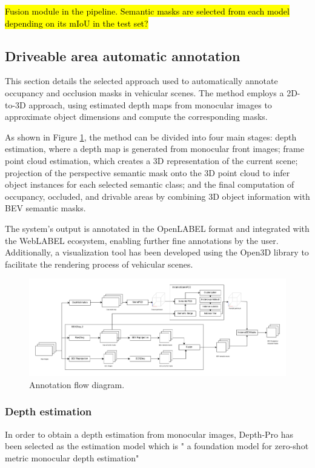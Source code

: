 \hl{Fusion module in the pipeline. Semantic masks are selected from each model depending on its mIoU in the test set?}


\subsection{Driveable area automatic annotation}
\label{aplication}

This section details the selected approach used to automatically annotate occupancy and occlusion masks in vehicular scenes. The method employs a 2D-to-3D approach, using estimated depth maps from monocular images to approximate object dimensions and compute the corresponding masks.

As shown in Figure \ref{fig:application_flow_diagram}, the method can be divided into four main stages: depth estimation, where a depth map is generated from monocular front images; frame point cloud estimation, which creates a 3D representation of the current scene; projection of the perspective semantic mask onto the 3D point cloud to infer object instances for each selected semantic class; and the final computation of occupancy, occluded, and drivable areas by combining 3D object information with BEV semantic masks.

The system's output is annotated in the OpenLABEL format and integrated with the WebLABEL \cite{weblabel} ecosystem, enabling further fine annotations by the user. Additionally, a visualization tool has been developed using the Open3D \cite{open3d} library to facilitate the rendering process of vehicular scenes.

\begin{figure}[h!]
    \centering
    \includegraphics[width=\linewidth]{images/metodology/Application_flow_diagram.png}
    \caption{Annotation flow diagram.}
    \label{fig:application_flow_diagram}
\end{figure}

\subsubsection{Depth estimation}
In order to obtain a depth estimation from monocular images, Depth-Pro \cite{depth-pro} has been selected as the estimation model which is " a foundation model for zero-shot metric monocular depth estimation"



